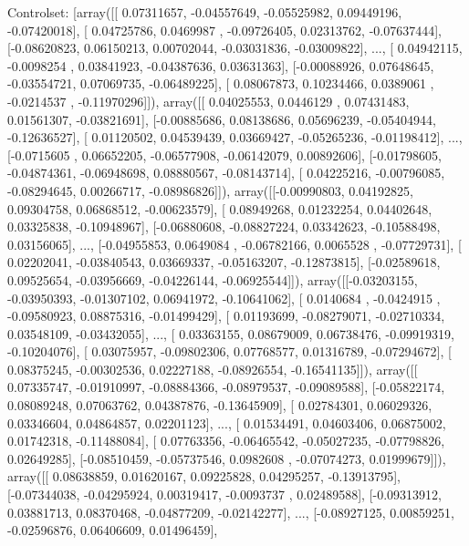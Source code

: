 \documentclass{article}
\begin{document}
Controlset: [array([[ 0.07311657, -0.04557649, -0.05525982,  0.09449196, -0.07420018],
       [ 0.04725786,  0.0469987 , -0.09726405,  0.02313762, -0.07637444],
       [-0.08620823,  0.06150213,  0.00702044, -0.03031836, -0.03009822],
       ..., 
       [ 0.04942115, -0.0098254 ,  0.03841923, -0.04387636,  0.03631363],
       [-0.00088926,  0.07648645, -0.03554721,  0.07069735, -0.06489225],
       [ 0.08067873,  0.10234466,  0.0389061 , -0.0214537 , -0.11970296]]), array([[ 0.04025553,  0.0446129 ,  0.07431483,  0.01561307, -0.03821691],
       [-0.00885686,  0.08138686,  0.05696239, -0.05404944, -0.12636527],
       [ 0.01120502,  0.04539439,  0.03669427, -0.05265236, -0.01198412],
       ..., 
       [-0.0715605 ,  0.06652205, -0.06577908, -0.06142079,  0.00892606],
       [-0.01798605, -0.04874361, -0.06948698,  0.08880567, -0.08143714],
       [ 0.04225216, -0.00796085, -0.08294645,  0.00266717, -0.08986826]]), array([[-0.00990803,  0.04192825,  0.09304758,  0.06868512, -0.00623579],
       [ 0.08949268,  0.01232254,  0.04402648,  0.03325838, -0.10948967],
       [-0.06880608, -0.08827224,  0.03342623, -0.10588498,  0.03156065],
       ..., 
       [-0.04955853,  0.0649084 , -0.06782166,  0.0065528 , -0.07729731],
       [ 0.02202041, -0.03840543,  0.03669337, -0.05163207, -0.12873815],
       [-0.02589618,  0.09525654, -0.03956669, -0.04226144, -0.06925544]]), array([[-0.03203155, -0.03950393, -0.01307102,  0.06941972, -0.10641062],
       [ 0.0140684 , -0.0424915 , -0.09580923,  0.08875316, -0.01499429],
       [ 0.01193699, -0.08279071, -0.02710334,  0.03548109, -0.03432055],
       ..., 
       [ 0.03363155,  0.08679009,  0.06738476, -0.09919319, -0.10204076],
       [ 0.03075957, -0.09802306,  0.07768577,  0.01316789, -0.07294672],
       [ 0.08375245, -0.00302536,  0.02227188, -0.08926554, -0.16541135]]), array([[ 0.07335747, -0.01910997, -0.08884366, -0.08979537, -0.09089588],
       [-0.05822174,  0.08089248,  0.07063762,  0.04387876, -0.13645909],
       [ 0.02784301,  0.06029326,  0.03346604,  0.04864857,  0.02201123],
       ..., 
       [ 0.01534491,  0.04603406,  0.06875002,  0.01742318, -0.11488084],
       [ 0.07763356, -0.06465542, -0.05027235, -0.07798826,  0.02649285],
       [-0.08510459, -0.05737546,  0.0982608 , -0.07074273,  0.01999679]]), array([[ 0.08638859,  0.01620167,  0.09225828,  0.04295257, -0.13913795],
       [-0.07344038, -0.04295924,  0.00319417, -0.0093737 ,  0.02489588],
       [-0.09313912,  0.03881713,  0.08370468, -0.04877209, -0.02142277],
       ..., 
       [-0.08927125,  0.00859251, -0.02596876,  0.06406609,  0.01496459],
\end{document}

